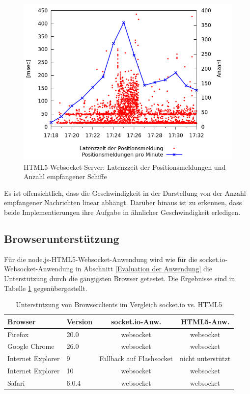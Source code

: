 \begin {figure}[H]
\begin{center}
  \includegraphics[width=4.5in]{images/latency_timeReceived_HTML5.png}
\end{center}
\caption{HTML5-Websocket-Server: Latenzzeit der Positionsmeldungen und Anzahl empfangener Schiffe}
\label {Latenzzeit HTML5}
\end {figure}
Es ist offensichtlich, dass die Geschwindigkeit in der Darstellung von der Anzahl empfangener Nachrichten linear abhängt.
Darüber hinaus ist zu erkennen, dass beide Implementierungen ihre Aufgabe in ähnlicher Geschwindigkeit erledigen. 

\subsection{Browserunterstützung}
Für die  node.js-HTML5-Websocket-Anwendung wird wie für die socket.io-Websocket-Anwendung in Abschnitt \ref{Evaluation der Anwendung} die Unterstützung durch die gängigsten Browser getestet. Die Ergebnisse sind in Tabelle \ref{Browserclients-Vergleich} gegenübergestellt.

\begin{table}
\begin{tabular}{ l|l|c|c}
Browser&Version&socket.io-Anw.&HTML5-Anw.\\\hline
Firefox& 20.0&websocket&websocket \\
Google Chrome & 26.0 &websocket&websocket\\
Internet Explorer&9& Fallback auf Flashsocket&nicht unterstützt\\
Internet Explorer&10& websocket&websocket\\
Safari&6.0.4 & websocket&websocket\\
\end{tabular}
\caption[Unterstützung von Browserclients im Vergleich socket.io vs. HTML5]{Unterstützung von Browserclients im Vergleich socket.io vs. HTML5}
\label{Browserclients-Vergleich}
\end{table}

